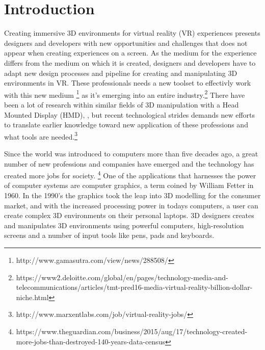 
\chapter{Introduction}
Creating immersive 3D environments for virtual reality (VR) experiences presents designers and developers with new opportunities and challenges that does not appear when creating experiences on a screen. As the medium for the experience differs from the medium on which it is created, designers and developers have to adapt new design processes and pipeline for creating and manipulating 3D environments in VR. These professionals needs a new toolset to effectivly work with this new medium \footnote{http://www.gamasutra.com/view/news/288508/} as it's emerging into an entire industry.\footnote{https://www2.deloitte.com/global/en/pages/technology-media-and-telecommunications/articles/tmt-pred16-media-virtual-reality-billion-dollar-niche.html} There have been a lot of research within similar fields of 3D manipulation with a Head Mounted Display (HMD),  \cite{relatedwork:kijimaand1997transition} \cite{relatedwork:bowman1996conceptual} \cite{relatedwork:stoakley1995virtual} \cite{relatedwork:mine1995isaac}, but recent technological strides demands new efforts to translate earlier knowledge toward new application of these professions and what tools are needed.\footnote{http://www.marxentlabs.com/job/virtual-reality-jobs/}

Since the world was introduced to computers more than five decades ago, a great number of new professions and companies have emerged and the technology has created more jobs for society. \footnote{https://www.theguardian.com/business/2015/aug/17/technology-created-more-jobs-than-destroyed-140-years-data-census} One of the applications that harnesses the power of computer systems are computer graphics, a term coined by William Fetter in 1960. \cite{3D_history:graphics_2017} In the 1990's the graphics took the leap into 3D modelling for the consumer market, and with the increased processing power in todays computers, a user can create complex 3D environments on their personal laptops. 3D designers creates and manipulates 3D environments using powerful computers, high-resolution screens and a number of input tools like pens, pads and keyboards.


